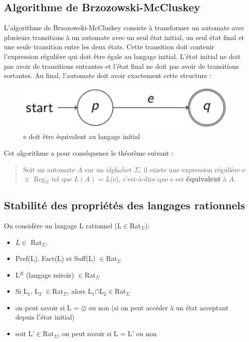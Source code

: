 \documentclass{article}
\begin{document}
\subsection{Algorithme de Brzozowski-McCluskey}
L'algorithme de Brzozowski-McCluskey consiste à transformer un automate avec plusieurs transitions à un automate avec un seul état initial, un seul état final et une seule transition entre les deux états. Cette transition doit contenir l'expression régulière qui doit être égale au langage initial. L'état initial ne doit pas avoir de transitions entrantes et l'état final ne doit pas avoir de transitions sortantes. Au final, l'automate doit avoir exactement cette structure :
\begin{figure}[h]
    \centering
    \includegraphics[scale=0.5]{Image17.png}
    \caption{e doit être équivalent au langage initial}
\end{figure}

Cet algorithme a pour conséquence le théorème suivant :
\begin{quote}
    Soit un automate $A$ sur un alphabet $\Sigma$, il existe une expression régulière e $\in$ Reg$_{\Sigma}$ tel que $L(A)$ = $L$(e), c'est-à-dire que e est \textbf{équivalent} à $A$.
\end{quote}

\subsection{Stabilité des propriétés des langages rationnels}
On considère un langage L rationnel (L$\in$Rat$_{\Sigma}$):
\begin{itemize}
    \item $\overline{L} \in$ Rat$_{\Sigma}$.
    \item Pref(L), Fact(L) et Suff(L) $\in$Rat$_{\Sigma}$
    \item L$^{R}$ (langage miroir) $\in$Rat$_{\Sigma}$
    \item Si L$_{1}$, L$_{2}$ $\in$Rat$_{\Sigma}$, alors L$_{1}$$\cap$L$_{2}$$\in$Rat$_{\Sigma}$
    \item on peut savoir si L = $\oslash$ ou non (si on peut accéder à un état acceptant depuis l'état initial)
    \item soit L'$\in$Rat$_{\Sigma}$, on peut savoir si L = L' ou non
\end{itemize}
\end{document}
